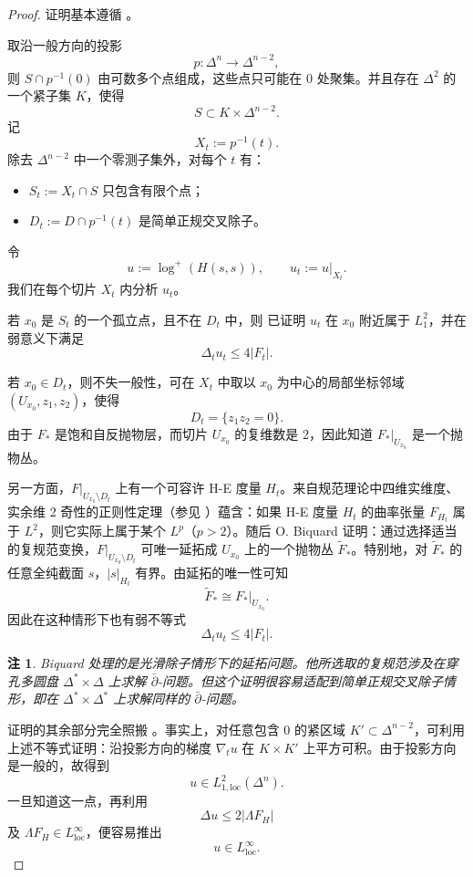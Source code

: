 \documentclass[12pt,a4paper]{article}
\newtheorem{remark}[theorem]{注}
\begin{document}
\begin{proof}
证明基本遵循 \cite[Section 1]{BandoSiu}。

取沿一般方向的投影
\[
p:\Delta^n\to \Delta^{n-2},
\]
则 \(S\cap p^{-1}(0)\) 由可数多个点组成，这些点只可能在 0 处聚集。并且存在 \(\Delta^2\) 的一个紧子集 \(K\)，使得
\[
S\subset K\times \Delta^{n-2}.
\]
记
\[
X_t:=p^{-1}(t).
\]
除去 \(\Delta^{n-2}\) 中一个零测子集外，对每个 \(t\) 有：
\begin{itemize}
\item \(S_t:=X_t\cap S\) 只包含有限个点；
\item \(D_t:=D\cap p^{-1}(t)\) 是简单正规交叉除子。
\end{itemize}
令
\[
u:=\log^+(H(s,s)),\qquad u_t:=u|_{X_t}.
\]
我们在每个切片 \(X_t\) 内分析 \(u_t\)。

若 \(x_0\) 是 \(S_t\) 的一个孤立点，且不在 \(D_t\) 中，则 \cite[Section 3]{BandoRemovable} 已证明 \(u_t\) 在 \(x_0\) 附近属于 \(L_1^2\)，并在弱意义下满足
\[
\Delta_t u_t\le 4|F_t|.
\]

若 \(x_0\in D_t\)，则不失一般性，可在 \(X_t\) 中取以 \(x_0\) 为中心的局部坐标邻域 \((U_{x_0},z_1,z_2)\)，使得
\[
D_t=\{z_1z_2=0\}.
\]
由于 \(F_*\) 是饱和自反抛物层，而切片 \(U_{x_0}\) 的复维数是 2，因此知道 \(F_*|_{U_{x_0}}\) 是一个抛物丛。

另一方面，\(F|_{U_{x_0}\setminus D_t}\) 上有一个可容许 H-E 度量 \(H_t\)。来自规范理论中四维实维度、实余维 2 奇性的正则性定理（参见 \cite{SibnerSibner}）蕴含：如果 H-E 度量 \(H_t\) 的曲率张量 \(F_{H_t}\) 属于 \(L^2\)，则它实际上属于某个 \(L^p\)（\(p>2\)）。随后 O. Biquard \cite[Theorem 2.1]{BiquardSurface} 证明：通过选择适当的复规范变换，\(F|_{U_{x_0}\setminus D_t}\) 可唯一延拓成 \(U_{x_0}\) 上的一个抛物丛 \(\widetilde F_*\)。特别地，对 \(\widetilde F_*\) 的任意全纯截面 \(s\)，\(|s|_{H_t}\) 有界。由延拓的唯一性可知
\[
\widetilde F_*\cong F_*|_{U_{x_0}}.
\]
因此在这种情形下也有弱不等式
\[
\Delta_t u_t\le 4|F_t|.
\]

\begin{remark}
Biquard 处理的是光滑除子情形下的延拓问题。他所选取的复规范涉及在穿孔多圆盘 \(\Delta^*\times \Delta\) 上求解 \(\bar\partial\)-问题。但这个证明很容易适配到简单正规交叉除子情形，即在 \(\Delta^*\times \Delta^*\) 上求解同样的 \(\bar\partial\)-问题。
\end{remark}

证明的其余部分完全照搬 \cite[Section 1]{BandoSiu}。事实上，对任意包含 0 的紧区域 \(K'\subset \Delta^{n-2}\)，可利用上述不等式证明：沿投影方向的梯度 \(\nabla_t u\) 在 \(K\times K'\) 上平方可积。由于投影方向是一般的，故得到
\[
u\in L_{1,\mathrm{loc}}^2(\Delta^n).
\]
一旦知道这一点，再利用
\[
\Delta u\le 2|\Lambda F_H|
\]
及 \(\Lambda F_H\in L^\infty_{\mathrm{loc}}\)，便容易推出
\[
u\in L^\infty_{\mathrm{loc}}.
\]
\end{proof}
\end{document}
